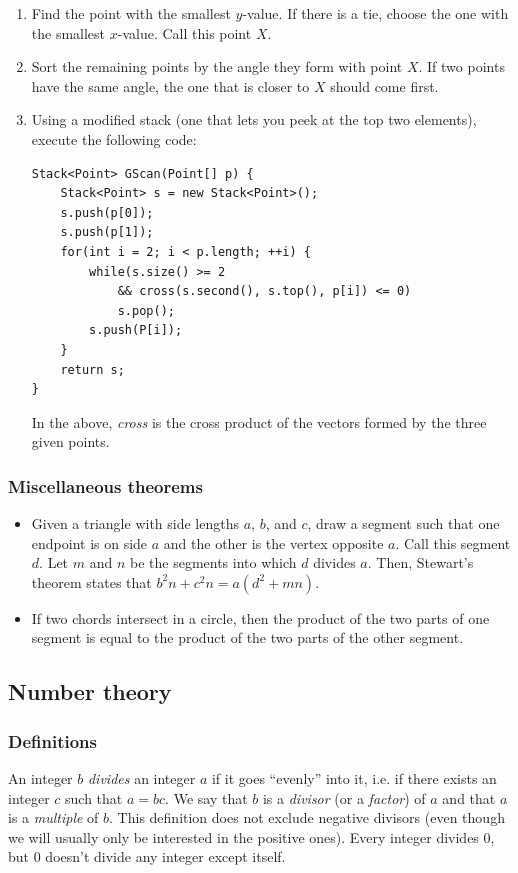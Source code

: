 \documentclass[a4paper,12pt]{article}
\begin{document}
\begin{enumerate}
\item Find the point with the smallest $y$-value. If there is a tie, choose the one with the smallest $x$-value. Call this point $X$.
\item Sort the remaining points by the angle they form with point $X$. If two points have the same angle, the one that is closer to $X$ should come first.
\item Using a modified stack (one that lets you peek at the top two elements), execute the following code:
\begin{lstlisting}
Stack<Point> GScan(Point[] p) {
	Stack<Point> s = new Stack<Point>();
	s.push(p[0]);
	s.push(p[1]);
	for(int i = 2; i < p.length; ++i) {
		while(s.size() >= 2
			&& cross(s.second(), s.top(), p[i]) <= 0)
			s.pop();
		s.push(P[i]);
	}
	return s;
}
\end{lstlisting}

In the above, {\em cross} is the cross product of the vectors formed by the three given points.

\end{enumerate}

\subsubsection{Miscellaneous theorems}
\begin{itemize}
\item Given a triangle with side lengths $a$, $b$, and $c$, draw a segment such that one endpoint is on side $a$ and the other is the vertex opposite $a$. Call this segment $d$. Let $m$ and $n$ be the segments into which $d$ divides $a$. Then, Stewart's theorem states that $b^2n+c^2n = a(d^2 + mn)$.
\item If two chords intersect in a circle, then the product of the two parts of one segment is equal to the product of the two parts of the other segment.
\end{itemize}

\subsection{Number theory}

\subsubsection{Definitions}

An integer $b$ {\em divides} an integer $a$ if it goes ``evenly'' into it, i.e. if there exists an integer $c$ such that $a=bc$. We say that $b$ is a {\em divisor} (or a {\em factor}) of $a$ and that $a$ is a {\em multiple} of $b$. This definition does not exclude negative divisors (even though we will usually only be interested in the positive ones). Every integer divides $0$, but $0$ doesn't divide any integer except itself.
\end{document}
